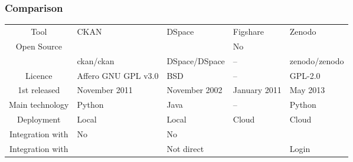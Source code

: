 \begin{frame}
\frametitle{Comparison}

\begin{table}
\scriptsize
\begin{tabularx}{\textwidth}{@{}c L L L L @{}}
 Tool 		& 	CKAN		& DSpace		& 	Figshare 	& Zenodo	\\
Open Source 						&  \yestab		& \yestab		& No			& \yestab	\\
\faGithub							& ckan/ckan 	& DSpace/DSpace & -- 			& zenodo/zenodo	\\
Licence								& Affero GNU GPL v3.0 & BSD 	& -- 			& GPL-2.0		\\
1st released						& November 2011	& November 2002 & January 2011 	& May 2013 		\\
Main technology 					& Python		& Java 			& --			& Python		\\
Deployment							& Local			& Local			& Cloud			& Cloud			\\
Integration with \faGithub 			& No	 		& No			& \yestab 		& \yestab		\\
Integration with \aiOrcid			& \yestab	 	& Not direct 	& \yestab 		& Login			\\
\end{tabularx}
\end{table}



\end{frame}




